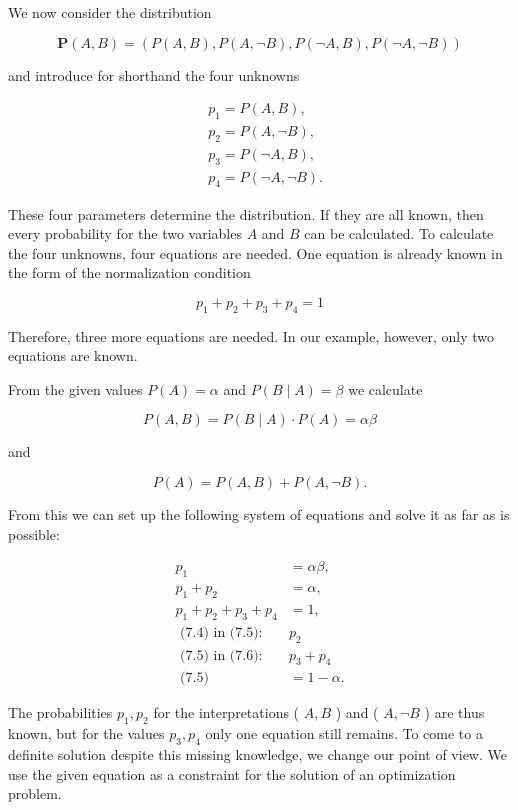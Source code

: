 \documentclass[10pt]{book}
\begin{document}
We now consider the distribution

$$
\boldsymbol{P}(A, B)=(P(A, B), P(A, \neg B), P(\neg A, B), P(\neg A, \neg B))
$$

and introduce for shorthand the four unknowns

$$
\begin{aligned}
& p_{1}=P(A, B), \\
& p_{2}=P(A, \neg B), \\
& p_{3}=P(\neg A, B), \\
& p_{4}=P(\neg A, \neg B) .
\end{aligned}
$$

These four parameters determine the distribution. If they are all known, then every probability for the two variables $A$ and $B$ can be calculated. To calculate the four unknowns, four equations are needed. One equation is already known in the form of the normalization condition

$$
p_{1}+p_{2}+p_{3}+p_{4}=1
$$

Therefore, three more equations are needed. In our example, however, only two equations are known.

From the given values $P(A)=\alpha$ and $P(B \mid A)=\beta$ we calculate

$$
P(A, B)=P(B \mid A) \cdot P(A)=\alpha \beta
$$

and

$$
P(A)=P(A, B)+P(A, \neg B) .
$$

From this we can set up the following system of equations and solve it as far as is possible:


\begin{align*}
p_{1} & =\alpha \beta,  \tag{7.4}\\
p_{1}+p_{2} & =\alpha,  \tag{7.5}\\
p_{1}+p_{2}+p_{3}+p_{4} & =1,  \tag{7.6}\\
\text { (7.4) in (7.5): } & p_{2}  \tag{7.7}\\
\text { (7.5) in (7.6): } & p_{3}+p_{4}  \tag{7.8}\\
\text { (7.5) } & =1-\alpha .
\end{align*}


The probabilities $p_{1}, p_{2}$ for the interpretations ( $A, B$ ) and ( $A, \neg B$ ) are thus known, but for the values $p_{3}, p_{4}$ only one equation still remains. To come to a definite solution despite this missing knowledge, we change our point of view. We use the given equation as a constraint for the solution of an optimization problem.
\end{document}
